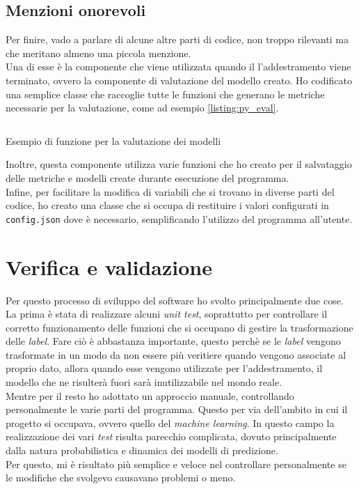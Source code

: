 \subsection{Menzioni onorevoli}\noindent
Per finire, vado a parlare di alcune altre parti di codice, non troppo rilevanti ma che meritano almeno una piccola menzione.\\
Una di esse è la componente che viene utilizzata quando il l'addestramento viene terminato, ovvero la componente di valutazione del modello creato.
Ho codificato una semplice classe che raccoglie tutte le funzioni che generano le metriche necessarie per la valutazione, come ad esempio \ref{listing:py_eval}.
\begin{listing}[H]
    \inputminted{python}{code/evaluation_example.py}
    \caption{Esempio di funzione per la valutazione dei modelli}
    \label{listing:py_eval}
\end{listing}\noindent
Inoltre, questa componente utilizza varie funzioni che ho creato per il salvataggio delle metriche e modelli create durante esecuzione del programma.\\
Infine, per facilitare la modifica di variabili che si trovano in diverse parti del codice, ho creato una classe che si occupa di restituire i valori configurati in \texttt{config.json} dove è necessario, semplificando l'utilizzo del programma all'utente.

\section{Verifica e validazione}\label{sec:test-validation}\noindent
Per questo processo di sviluppo del software ho svolto principalmente due cose.
La prima è stata di realizzare alcuni \textit{unit test}, soprattutto per controllare il corretto funzionamento delle funzioni che si occupano di gestire la trasformazione delle \textit{label}.
Fare ciò è abbastanza importante, questo perchè se le \textit{label} vengono trasformate in un modo da non essere più veritiere quando vengono associate al proprio dato, allora quando esse vengono utilizzate per l'addestramento, il modello che ne risulterà fuori sarà inutilizzabile nel mondo reale.\\
Mentre per il resto ho adottato un approccio manuale, controllando personalmente le varie parti del programma.
Questo per via dell'ambito in cui il progetto si occupava, ovvero quello del \textit{machine learning}. In questo campo la realizzazione dei vari \textit{test} risulta parecchio complicata, dovuto principalmente dalla natura probabilistica e dinamica dei modelli di predizione.\\
Per questo, mi è risultato più semplice e veloce nel controllare personalmente se le modifiche che svolgevo causavano problemi o meno.

